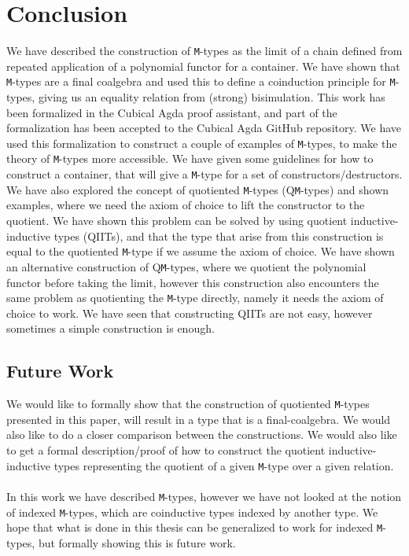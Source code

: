 \documentclass[twoside,11pt,openright]{report}
\theoremstyle{plain} %
\theoremstyle{definition}
\theoremstyle{remark}
\begin{document}
\chapter{Conclusion}
\label{ch:conclusion}

We have described the construction of \texttt{M}-types as the limit of a chain defined from repeated application of a polynomial functor for a container. We have shown that \texttt{M}-types are a final coalgebra and used this to define a coinduction principle for \texttt{M}-types, giving us an equality relation from (strong) bisimulation. This work has been formalized in the Cubical Agda proof assistant, and part of the formalization has been accepted to the Cubical Agda GitHub repository. We have used this formalization to construct a couple of examples of \texttt{M}-types, to make the theory of \texttt{M}-types more accessible. We have given some guidelines for how to construct a container, that will give a \texttt{M}-type for a set of constructors/destructors. We have also explored the concept of quotiented \texttt{M}-types (Q\texttt{M}-types) and shown examples, where we need the axiom of choice to lift the constructor to the quotient. We have shown this problem can be solved by using quotient inductive-inductive types (QIITs), and that the type that arise from this construction is equal to the quotiented \texttt{M}-type if we assume the axiom of choice. We have shown an alternative construction of Q\texttt{M}-types, where we quotient the polynomial functor before taking the limit, however this construction also encounters the same problem as quotienting the \texttt{M}-type directly, namely it needs the axiom of choice to work. We have seen that constructing QIITs are not easy, however sometimes a simple construction is enough.

\section{Future Work}
We would like to formally show that the construction of quotiented \texttt{M}-types presented in this paper, will result in a type that is a final-coalgebra. We would also like to do a closer comparison between the constructions. We would also like to get a formal description/proof of how to construct the quotient inductive-inductive types representing the quotient of a given \texttt{M}-type over a given relation.
\\ \\
In this work we have described \texttt{M}-types, however we have not looked at the notion of indexed \texttt{M}-types, which are coinductive types indexed by another type. We hope that what is done in this thesis can be generalized to work for indexed \texttt{M}-types, but formally showing this is future work.
\end{document}
